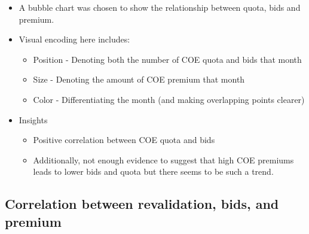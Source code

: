 \documentclass[a4paper, 11pt]{article}
\begin{document}
\begin{itemize}
\item A bubble chart was chosen to show the relationship between quota, bids and premium.
\item Visual encoding here includes:
\begin{itemize}
\item Position - Denoting both the number of COE quota and bids that month
\item Size - Denoting the amount of COE premium that month
\item Color - Differentiating the month (and making overlapping points clearer)
\end{itemize}
\item Insights
\begin{itemize}
\item Positive correlation between COE quota and bids
\item Additionally, not enough evidence to suggest that high COE premiums leads to lower bids and quota but there seems to be such a trend.
\end{itemize}
\end{itemize}
\subsection{Correlation between revalidation, bids, and premium}
\label{sec:orgea7255f}
\end{document}
